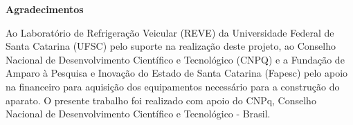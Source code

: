 \newpage
\begin{center}
    \textbf{Agradecimentos}
\end{center}

{\fontsize{12pt}{14pt}\selectfont 

Ao Laboratório de Refrigeração Veicular (REVE) da Universidade Federal de Santa Catarina (UFSC) pelo suporte na realização deste projeto, ao Conselho Nacional de Desenvolvimento Científico e Tecnológico (CNPQ) e a Fundação de Amparo à Pesquisa e Inovação do Estado de Santa Catarina (Fapesc) pelo apoio na financeiro para aquisição dos equipamentos necessário para a construção do aparato.
O presente trabalho foi realizado com apoio do CNPq, Conselho Nacional de Desenvolvimento Científico e Tecnológico - Brasil.
}